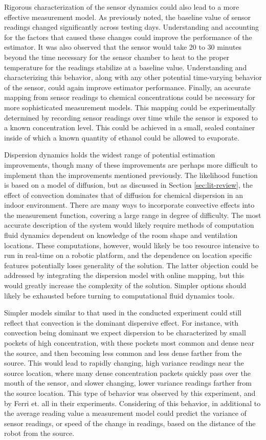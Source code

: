 \documentclass[submit, 12pt]{aiaa-pretty-modified}
\begin{document}
Rigorous characterization of the sensor dynamics could also lead to a more
effective measurement model. As previously noted, the baseline value of sensor
readings changed significantly across testing days. Understanding and accounting
for the factors that caused these changes could improve the performance of the
estimator. It was also observed that the sensor would take 20 to 30 minutes
beyond the time necessary for the sensor chamber to heat to the proper
temperature for the readings stabilize at a baseline value. Understanding and
characterizing this behavior, along with any other potential time-varying
behavior of the sensor, could again improve estimator performance. Finally, an
accurate mapping from sensor readings to chemical concentrations could be
necessary for more sophisticated measurement models.  This mapping could be
experimentally determined by recording sensor readings over time while the sensor
is exposed to a known concentration level. This could be achieved in a small, sealed
container inside of which a known quantity of ethanol could be allowed to
evaporate. 

Dispersion dynamics holds the widest range of potential estimation
improvements, though many of these improvements are perhaps more difficult to
implement than the improvements mentioned previously.  The likelihood function
is based on a model of diffusion, but as discussed in Section
\ref{sec:lit-review}, the effect of convection dominates that of diffusion for
chemical dispersion in an indoor environment. There are many ways to incorporate
convective effects into the measurement function, covering a large range in
degree of difficulty. The most accurate description of the system would likely
require methods of computation fluid dynamics dependent on knowledge of the room
shape and ventilation locations. These computations, however, would likely be
too resource intensive to run in real-time on a robotic platform, and the
dependence on location specific features potentially loses generality of the
solution. The latter objection could be addressed by integrating the dispersion
model with online mapping, but this would greatly increase the complexity of the
solution. Simpler options should likely be exhausted before turning to
computational fluid dynamics tools.

Simpler models similar to that used in the conducted experiment could still
reflect that convection is the dominant dispersive effect. For instance, with
convection being dominant we expect dispersion to be characterized by small
pockets of high concentration, with these pockets most common and dense near the
source, and then becoming less common and less dense farther from the source.
This would lead to rapidly changing, high variance readings near the source
location, where many dense concentration packets quickly pass over the mouth of
the sensor, and slower changing, lower variance readings farther from the source
location. This type of behavior was observed by this experiment, and by Ferri
et. all in their experiments. \cite{ferri} Considering of this behavior, in
additional to the average reading value a measurement model could predict the
variance of sensor readings, or speed of the change in readings, based on
the distance of the robot from the source.
\end{document}

